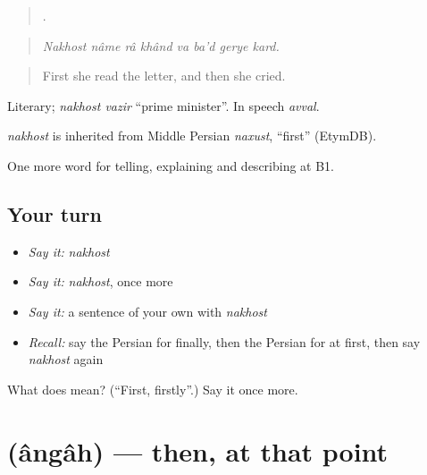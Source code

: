 \begin{quote}
       .
\end{quote}

\begin{quote}
\emph{Nakhost nâme râ khând va ba'd gerye kard.}
\end{quote}

\begin{quote}
First she read the letter, and then she cried.
\end{quote}

Literary; \emph{nakhost vazir} \textquotedblleft{}prime minister\textquotedblright{}. In speech \emph{avval}.

\begin{cousinweb}
\emph{nakhost} is inherited from Middle Persian \emph{naxust}, \textquotedblleft{}first\textquotedblright{} (EtymDB).
\end{cousinweb}

\begin{grammarlens}[title={What you've built}]
One more word for telling, explaining and describing at B1.
\end{grammarlens}

\subsection*{Your turn}
\begin{itemize}
\raggedright
  \item \emph{Say it:} \emph{nakhost}
  \item \emph{Say it:} \emph{nakhost}, once more
  \item \emph{Say it:} a sentence of your own with \emph{nakhost}
  \item \emph{Recall:} say the Persian for finally, then the Persian for at first, then say \emph{nakhost} again
\end{itemize}

\begin{tcolorbox}[breakable,colback=teal!4,colframe=teal!35!black,title={Before you move on}]
What does  mean? (\textquotedblleft{}First, firstly\textquotedblright{}.) Say it once more.
\end{tcolorbox}
\section[\texorpdfstring{\fa{آنگاه} (ângâh)}{آنگاه (ângâh)}]{ (ângâh) — then, at that point}

